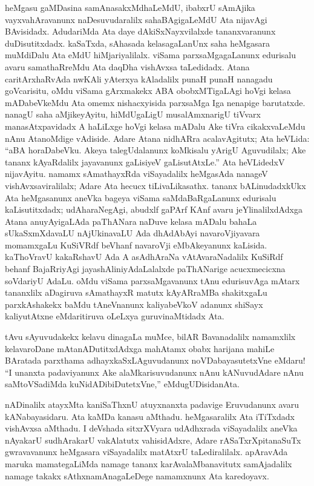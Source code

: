 heMgasu gaMDasina samAnasakxMdhaLeMdU, ibabxrU sAmAjika vayxvahAravanunx naDesuvudaralilx sahaBAgigaLeMdU Ata nijavAgi BAvisidadx. AdudariMda Ata daye dAkiSxNayxvilalxde tananxvaranunx duDisutitxdadx. kaSaTxda, sAhasada kelasagaLanUnx saha heMgasara muMdiDalu Ata eMdU hiMjariyalilalx. viSama parxsaMgagaLanunx edurisalu avaru samathaRreMdu Ata daqDha vishAvxsa taLedidadx. Atana caritArxhaRvAda nwKAli yAterxya kAladalilx punaH punaH nanagadu goVcarisitu, oMdu viSama gArxmakekx ABA obobxMTigaLAgi hoVgi kelasa mADabeVkeMdu Ata omemx nishacxyisida parxsaMga Iga nenapige barutatxde. nanagU saha aMjikeyAyitu, hiMdUgaLigU musalAmxnarigU tiVvarx manasAtxpavidadx A haLiLxge hoVgi kelasa mADalu Ake tiVra cikakxvaLeMdu nAnu AtanoMdige vAdiside. Adare Atana nidhARra acalavAgitutx; Ata heVLida: ``aBA horaDabeVku. Akeya talegUdalanunx koMkisalu yArigU Aguvudilalx; Ake tananx kAyaRdalilx jayavanunx gaLisiyeV gaLisutAtxLe.'' Ata heVLidedxV nijavAyitu. namamx sAmathayxRda viSayadalilx heMgasAda nanageV vishAvxsaviralilalx; Adare Ata hecucx tiLivaLikasathx. tananx bALinudadxkUkx Ata heMgasanunx aneVka bageya viSama saMdaBaRgaLanunx edurisalu kaLisutitxdadx; udAharaNegAgi, abudxlf gaPArf KAnf avaru jeYlinalilxdAdxga Atana anuyAyigaLAda paThANara naDuve kelasa mADalu bahaLa sUkaSxmXdavaLU nAjUkinavaLU Ada dhAdAbAyi navaroVjiyavara momamxgaLu KuSiVRdf beVhanf navaroVji eMbAkeyanunx kaLisida. kaThoVravU kakaRshavU Ada A asAdhAraNa vAtAvaraNadalilx KuSiRdf behanf BajaRriyAgi jayashAliniyAdaLalalxde paThANarige acucxmecicxna soVdariyU AdaLu. oMdu viSama parxsaMgavanunx tAnu edurisuvAga mAtarx tananxlilx aDagiruva sAmathayxR matutx kAyARraMBa shakitxgaLu parxkAshakekx baMdu tAneVnanunx kaliyabeVkoV adanunx shiSayx kaliyutAtxne eMdaritiruva oLeLxya guruvinaMtidadx Ata.

tAvu sAyuvudakekx kelavu dinagaLa muMce, bilAR Bavanadalilx namamxlilx kelava\-roDane mAtanADutitxdAdxga mahAtamx obabx harijana mahiLe BAratada parxthama adhayxkaSx\-LAguvudanunx noVDabayasutetxVne eMdaru! ``I unanxta padaviyanunx Ake alaMkarisuvudanunx nAnu kANuvudAdare nAnu saMtoVSadiMda kuNidADibiDutetxVne,'' eMdu\-gUDisidanAta.

nADinalilx atayxMta kaniSaThxnU atuyxnanxta padavige Eruvudanunx avaru kANabayasi\-daru. Ata kaMDa kanasu aMthadu. heMgasaralilx Ata iTiTxdadx vishAvxsa aMthadu. I deVshada sitxrXVyara udAdhxrada viSayadalilx aneVka nAyakarU sudhArakarU vakAlatutx vahisidAdxre, Adare rASaTxrXpitanaSuTx gwravavanunx heMgasara viSayadalilx matAtxrU taLediralilalx. apAravAda maruka mamategaLiMda namage tananx karAvalaMbanavitutx samAjadalilx namage takakx sAthxnamAnagaLeDege namamxnunx Ata karedoyavx.


